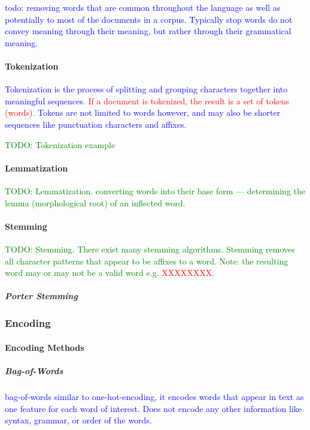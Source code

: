 \textcolor{blue}{todo: removing words that are common throughout the language as well as potentially to most of the documents in a corpus. Typically stop words do not convey meaning through their meaning, but rather through their grammatical meaning.}

\paragraph{Tokenization}

\textcolor{blue}{Tokenization is the process of splitting and grouping characters together into meaningful sequences. \textcolor{red}{If a document is tokenized, the result is a set of tokens (words).} Tokens are not limited to words however, and may also be shorter sequences like punctuation characters and affixes.}

\textcolor{green}{TODO: Tokenization example}

\paragraph{Lemmatization}

\textcolor{green}{TODO: Lemmatization. converting words into their base form --- determining the lemma (morphological root) of an inflected word.}

\paragraph{Stemming}

\textcolor{green}{TODO: Stemming. There exist many stemming algorithms. Stemming removes all character patterns that appear to be affixes to a word. Note: the resulting word may or may not be a valid word e.g. \textcolor{red}{XXXXXXXX}.}

\subparagraph{Porter Stemming}

\subsubsection{Encoding}

\paragraph{Encoding Methods}

\subparagraph{Bag-of-Words}

\textcolor{blue}{{bag-of-words} similar to one-hot-encoding, it encodes words that appear in text as one feature for each word of interest. Does not encode any other information like syntax, grammar, or order of the words.}

